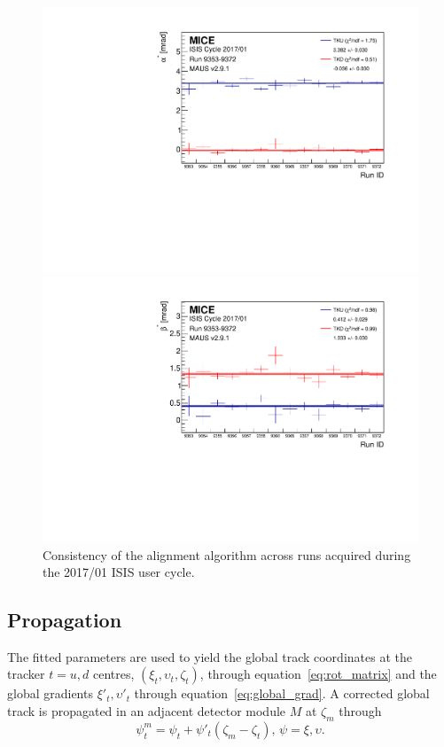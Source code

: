 \begin{figure} [!htb]
	\begin{minipage}[b]{.49\textwidth}
		\centering
		\includegraphics[width=\textwidth]{data_final/alpha_bestfit.pdf}
	\end{minipage}
	\hfill
	\begin{minipage}[b]{.49\textwidth}
		\centering
		\includegraphics[width=\textwidth]{data_final/beta_bestfit.pdf}
	\end{minipage}
	\caption{Consistency of the alignment algorithm across runs acquired during the 2017/01 ISIS user cycle.}
	\label{fig:runtorun}
\end{figure}

\subsection{Propagation}
\label{SubSect:DA_Propagation}
The fitted parameters are used to yield the global track coordinates at the tracker $t=u,d$ centres, $(\xi_t,\upsilon_t,\zeta_t)$, through equation~\ref{eq:rot_matrix} and the global gradients $\xi'_t,\upsilon'_t$ through equation~\ref{eq:global_grad}. A corrected global track is propagated in an adjacent detector module $M$ at $\zeta_m$ through
\begin{equation}
\psi_t^m=\psi_t+\psi'_t(\zeta_m-\zeta_t),\,\psi=\xi,\upsilon.
\end{equation}

